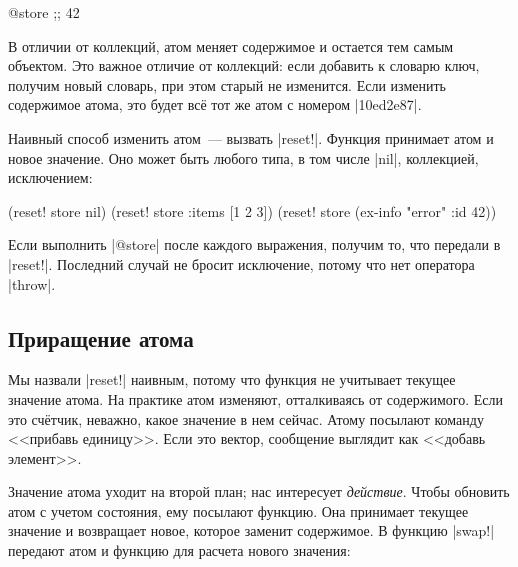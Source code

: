 
\begin{english}
  \begin{clojure}
@store ;; 42
  \end{clojure}
\end{english}

В отличии от коллекций, атом меняет содержимое и остается тем самым
объектом. Это важное отличие от коллекций: если добавить к словарю ключ, получим
новый словарь, при этом старый не изменится. Если изменить содержимое атома, это
будет вс\"{е} тот же атом с номером \spverb|10ed2e87|.


Наивный способ изменить атом~--- вызвать \spverb|reset!|. Функция принимает атом
и новое значение. Оно может быть любого типа, в том числе \spverb|nil|,
коллекцией, исключением:

\begin{english}
  \begin{clojure}
(reset! store nil)
(reset! store {:items [1 2 3]})
(reset! store (ex-info "error" {:id 42}))
  \end{clojure}
\end{english}

Если выполнить \spverb|@store| после каждого выражения, получим то, что передали
в \spverb|reset!|. Последний случай не бросит исключение, потому что нет
оператора \spverb|throw|.

\subsection{Приращение атома}


Мы назвали \spverb|reset!| наивным, потому что функция не учитывает текущее
значение атома. На практике атом изменяют, отталкиваясь от содержимого. Если это
сч\"{е}тчик, неважно, какое значение в нем сейчас. Атому посылают команду <<прибавь
единицу>>. Если это вектор, сообщение выглядит как <<добавь элемент>>.

Значение атома уходит на второй план; нас интересует \emph{действие}. Чтобы
обновить атом с учетом состояния, ему посылают функцию. Она принимает текущее
значение и возвращает новое, которое заменит содержимое. В функцию
\spverb|swap!| передают атом и функцию для расчета нового значения:

